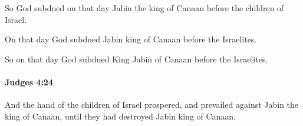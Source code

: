 			\begin{versebox}
					\item[BHS] 
					\item[ASV] So God subdued on that day Jabin the king of Canaan before the children of Israel.
					\item[NIV] On that day God subdued Jabin king of Canaan before the Israelites.
					\item[NRSV] So on that day God subdued King Jabin of Canaan before the Israelites.
			\end{versebox}

		\paragraph{Judges 4:24} %
			\label{JUDGES-4-24}

			And the hand of the children of Israel prospered, and prevailed against Jabin the king of Canaan, until they had destroyed Jabin king of Canaan.

